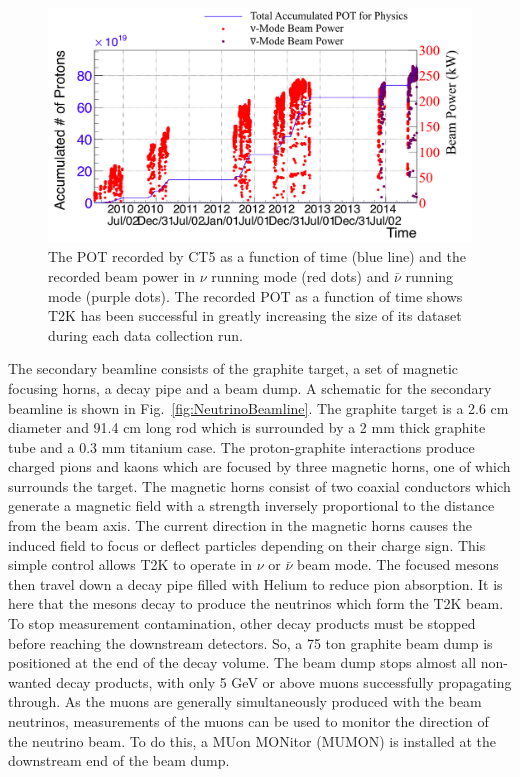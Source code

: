 \begin{figure}
  \centering
  \includegraphics[width=15cm]{images/t2k/pot_history.png}
  \caption{The POT recorded by CT5 as a function of time (blue line) and the recorded beam power in $\nu$ running mode (red dots) and $\bar{\nu}$ running mode (purple dots).  The recorded POT as a function of time shows T2K has been successful in greatly increasing the size of its dataset during each data collection run.}
  \label{fig:POTHistory}
\end{figure}
\newline
The secondary beamline consists of the graphite target, a set of magnetic focusing horns, a decay pipe and a beam dump.  A schematic for the secondary beamline is shown in Fig.~\ref{fig:NeutrinoBeamline}.  The graphite target is a 2.6 cm diameter and 91.4 cm long rod which is surrounded by a 2 mm thick graphite tube and a 0.3 mm titanium case.  The proton-graphite interactions produce charged pions and kaons which are focused by three magnetic horns, one of which surrounds the target.  The magnetic horns consist of two coaxial conductors which generate a magnetic field with a strength inversely proportional to the distance from the beam axis.  The current direction in the magnetic horns causes the induced field to focus or deflect particles depending on their charge sign.  This simple control allows T2K to operate in $\nu$ or $\bar{\nu}$ beam mode.  The focused mesons then travel down a decay pipe filled with Helium to reduce pion absorption.  It is here that the mesons decay to produce the neutrinos which form the T2K beam.  To stop measurement contamination, other decay products must be stopped before reaching the downstream detectors.  So, a 75 ton graphite beam dump is positioned at the end of the decay volume.  The beam dump stops almost all non-wanted decay products, with only 5 GeV or above muons successfully propagating through.  As the muons are generally simultaneously produced with the beam neutrinos, measurements of the muons can be used to monitor the direction of the neutrino beam.  To do this, a MUon MONitor (MUMON) is installed at the downstream end of the beam dump.


